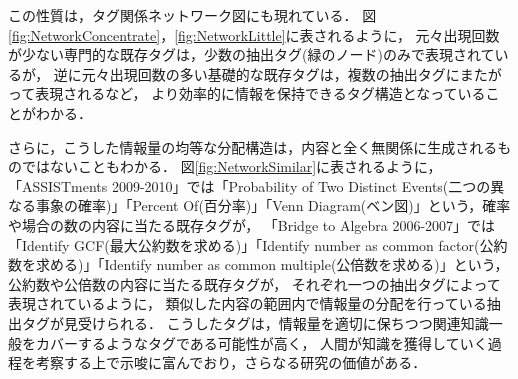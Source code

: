 この性質は，タグ関係ネットワーク図にも現れている．
図\ref{fig:NetworkConcentrate}，\ref{fig:NetworkLittle}に表されるように，
元々出現回数が少ない専門的な既存タグは，少数の抽出タグ(緑のノード)のみで表現されているが，
逆に元々出現回数の多い基礎的な既存タグは，複数の抽出タグにまたがって表現されるなど，
より効率的に情報を保持できるタグ構造となっていることがわかる．

さらに，こうした情報量の均等な分配構造は，内容と全く無関係に生成されるものではないこともわかる．
図\ref{fig:NetworkSimilar}に表されるように，
「ASSISTments 2009-2010」では「Probability of Two Distinct Events(二つの異なる事象の確率)」「Percent Of(百分率)」「Venn Diagram(ベン図)」という，確率や場合の数の内容に当たる既存タグが，
「Bridge to Algebra 2006-2007」では「Identify GCF(最大公約数を求める)」「Identify number as common factor(公約数を求める)」「Identify number as common multiple(公倍数を求める)」という，公約数や公倍数の内容に当たる既存タグが，
それぞれ一つの抽出タグによって表現されているように，
類似した内容の範囲内で情報量の分配を行っている抽出タグが見受けられる．
こうしたタグは，情報量を適切に保ちつつ関連知識一般をカバーするようなタグである可能性が高く，
人間が知識を獲得していく過程を考察する上で示唆に富んでおり，さらなる研究の価値がある．



